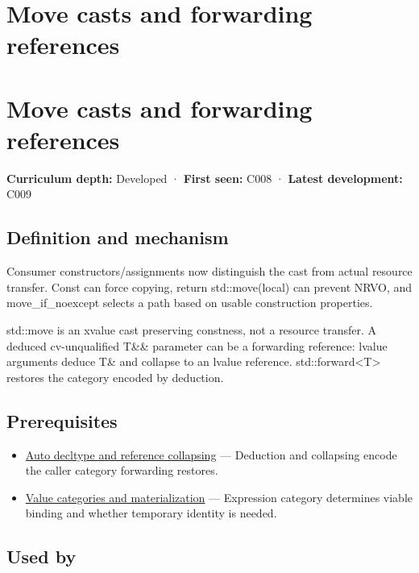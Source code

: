 \hypertarget{appendix-0104b704fb11}{}
\section*{Move casts and forwarding references}
\section{Move casts and forwarding references}\label{appendix-0104b704fb11-move-casts-and-forwarding-references}

\textbf{Curriculum depth:} Developed · \textbf{First seen:} C008 · \textbf{Latest development:} C009

\subsection{Definition and mechanism}\label{appendix-0104b704fb11-definition-and-mechanism}

Consumer constructors/assignments now distinguish the cast from actual resource transfer. Const can force copying, return std::move(local) can prevent NRVO, and move\_if\_noexcept selects a path based on usable construction properties.

std::move is an xvalue cast preserving constness, not a resource transfer. A deduced cv-unqualified T\&\& parameter can be a forwarding reference: lvalue arguments deduce T\& and collapse to an lvalue reference. std::forward\textless T\textgreater{} restores the category encoded by deduction.

\subsection{Prerequisites}\label{appendix-0104b704fb11-prerequisites}

\begin{itemize}
\tightlist
\item
  \hyperref[appendix-5d4252a42886]{Auto decltype and reference collapsing} --- Deduction and collapsing encode the caller category forwarding restores.
\item
  \hyperref[appendix-1121b30eaeb0]{Value categories and materialization} --- Expression category determines viable binding and whether temporary identity is needed.
\end{itemize}

\subsection{Used by}\label{appendix-0104b704fb11-used-by}

